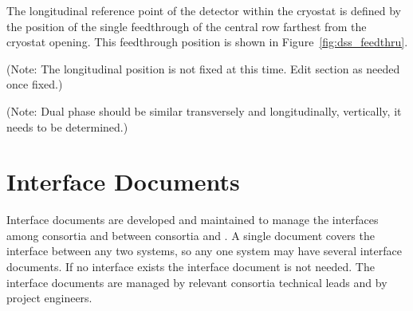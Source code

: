 The longitudinal reference point of the detector within the cryostat
is defined by the position of the single feedthrough of the central row
farthest from the cryostat opening. This feedthrough position
is shown in Figure~\ref{fig:dss_feedthru}.

(Note: The longitudinal position is not fixed at this time. Edit
section as needed once fixed.)


(Note: Dual phase should be similar
transversely and longitudinally, vertically, it needs to be
determined.)


\section{Interface Documents}
\label{sec:fdsp-coord-integ-interface}


Interface documents are developed and maintained to manage the
interfaces among consortia and between consortia and . A
single document covers the interface between any two systems, so any
one system may have several interface documents. If no interface
exists the interface document is not needed. The
interface documents are managed by relevant consortia technical leads
and by  project engineers.

